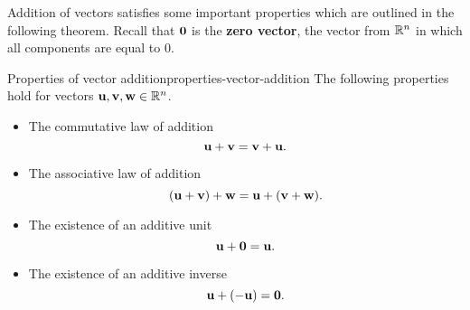 Addition of vectors satisfies some important properties which are
outlined in the following theorem.  Recall that $\vect{0}$ is the
\textbf{zero vector}, the vector
from $\mathbb{R}^{n}$ in which all components are equal to $0$.

\begin{theorem}{Properties of vector addition}{properties-vector-addition}
  The following properties hold for vectors
  $\vect{u},\vect{v},\vect{w}\in\R^{n}$.%
  \begin{itemize}
  \item The commutative law of addition%
    \begin{equation*}
      \vect{u}+\vect{v}=\vect{v}+\vect{u}.
    \end{equation*}
  \item The associative law of addition
    \begin{equation*}
      (\vect{u}+\vect{v}) +\vect{w}=\vect{u}+(\vect{v}+\vect{w}).
    \end{equation*}
  \item The existence of an additive unit%
    \begin{equation*}
      \vect{u}+\vect{0}=\vect{u}.
    \end{equation*}
  \item The existence of an additive inverse
    \begin{equation*}
      \vect{u}+(-\vect{u}) =\vect{0}.
    \end{equation*}
  \end{itemize}
\end{theorem}

